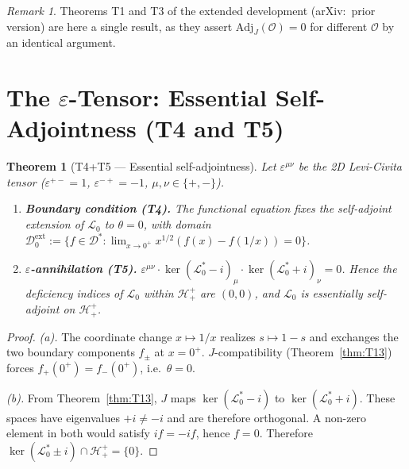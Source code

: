 \documentclass[12pt,a4paper]{article}
\newtheorem{theorem}{Theorem}[section]
\theoremstyle{remark}
\newtheorem*{remark}{Remark}
\newcommand{\Adj}{\mathrm{Adj}}
\begin{document}
\begin{remark}
Theorems T1 and T3 of the extended development (arXiv:~prior version)
are here a single result, as they assert $\Adj_J(\mathcal{O})=0$
for different $\mathcal{O}$ by an identical argument.
\end{remark}


\section{The $\varepsilon$-Tensor: Essential Self-Adjointness (T4 and T5)}
\label{sec:epsilon}

\begin{theorem}[T4+T5 --- Essential self-adjointness]\label{thm:T45}
Let $\varepsilon^{\mu\nu}$ be the 2D Levi-Civita tensor
($\varepsilon^{+-}=1$, $\varepsilon^{-+}=-1$, $\mu,\nu\in\{+,-\}$).
\begin{enumerate}[label=(\alph*),leftmargin=*]
\item \textbf{Boundary condition (T4).}
The functional equation fixes the self-adjoint extension of $\mathcal{L}_0$
to $\theta=0$, with domain
$\mathcal{D}_0^{\mathrm{ext}}
:=\{f\in\mathcal{D}^*:\lim_{x\to0^+}x^{1/2}(f(x)-f(1/x))=0\}$.
\item \textbf{$\varepsilon$-annihilation (T5).}
$\varepsilon^{\mu\nu}
\cdot\ker(\mathcal{L}_0^*-i)_\mu
\cdot\ker(\mathcal{L}_0^*+i)_\nu = 0$.
Hence the deficiency indices of $\mathcal{L}_0$ within $\mathcal{H}^+_+$
are $(0,0)$, and $\mathcal{L}_0$ is essentially self-adjoint on
$\mathcal{H}^+_+$.
\end{enumerate}
\end{theorem}
\begin{proof}
\emph{(a).}
The coordinate change $x\mapsto1/x$ realizes $s\mapsto1-s$ and
exchanges the two boundary components $f_\pm$ at $x=0^+$.
$J$-compatibility (Theorem~\ref{thm:T13}) forces $f_+(0^+)=f_-(0^+)$,
i.e.\ $\theta=0$.

\emph{(b).}
From Theorem~\ref{thm:T13}, $J$ maps $\ker(\mathcal{L}_0^*-i)$ to
$\ker(\mathcal{L}_0^*+i)$.
These spaces have eigenvalues $+i\neq-i$ and are therefore orthogonal.
A non-zero element in both would satisfy $if=-if$, hence $f=0$.
Therefore $\ker(\mathcal{L}_0^*\pm i)\cap\mathcal{H}^+_+=\{0\}$.
\end{proof}
\end{document}
